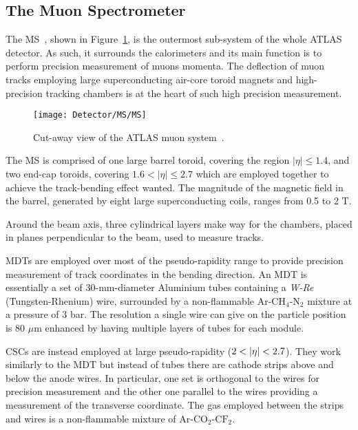 		\subsection{The Muon Spectrometer}
		\label{sec:MuSpec}

			The \ac{MS}~\cite{MSTDR}, shown in Figure~\ref{fig:MS}, is the outermost sub-system of the whole \ac{ATLAS} detector. As such, it surrounds the calorimeters and its main function is to perform precision measurement of muons momenta. The deflection of muon tracks employing large superconducting air-core toroid magnets and high-precision tracking chambers is at the heart of such high precision measurement. 

			\begin{figure}[!htb]
				\centering
				\texttt{[image: Detector/MS/MS]}
				\caption{Cut-away view of the \ac{ATLAS} muon system~\cite{ATLASJINST}.}
				\label{fig:MS}
			\end{figure}

			The \ac{MS} is comprised of one large barrel toroid, covering the region $\left| \eta \right | \leq 1.4$, and two end-cap toroids, covering $1.6 < \left| \eta \right| \leq 2.7$ which are employed together to achieve the track-bending effect wanted. The magnitude of the magnetic field in the barrel, generated by eight large superconducting coils, ranges from 0.5 to 2 T. 

			Around the beam axis, three cylindrical layers make way for the chambers, placed in planes perpendicular to the beam, used to measure tracks. 

			\acp{MDT} are employed over most of the pseudo-rapidity range to provide precision measurement of track coordinates in the bending direction. An MDT is essentially a set of 30-mm-diameter Aluminium tubes containing a \emph{W-Re} (Tungsten-Rhenium) wire, surrounded by a non-flammable $\mathrm{Ar}$-$\mathrm{CH_4}$-$\mathrm{N_2}$ mixture at a pressure of 3 bar. The resolution a single wire can give on the particle position is 80 $\mu$m enhanced by having multiple layers of tubes for each module.
			
			\acp{CSC} are instead employed at large pseudo-rapidity ($2 < |\eta| < 2.7$). They work similarly to the MDT but instead of tubes there are cathode strips above and below the anode wires. In particular, one set is orthogonal to the wires for precision measurement and the other one parallel to the wires providing a measurement of the transverse coordinate. The gas employed between the strips and wires is a non-flammable mixture of $\mathrm{Ar}$-$\mathrm{CO_2}$-$\mathrm{CF_2}$.


